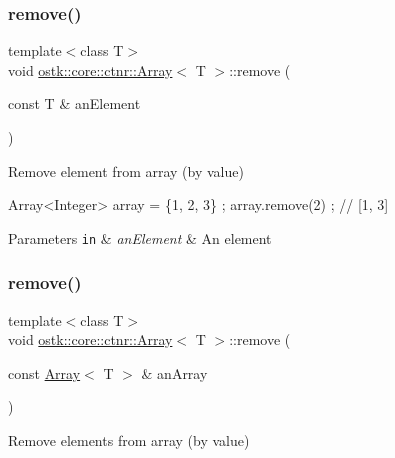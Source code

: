 \subsubsection{\texorpdfstring{remove()}{remove()}\hspace{0.1cm}{\footnotesize\ttfamily [1/2]}}
{\footnotesize\ttfamily template$<$class T$>$ \\
void \hyperlink{classostk_1_1core_1_1ctnr_1_1_array}{ostk\+::core\+::ctnr\+::\+Array}$<$ T $>$\+::remove (\begin{DoxyParamCaption}\item[{const T \&}]{an\+Element }\end{DoxyParamCaption})}



Remove element from array (by value) 


\begin{DoxyCode}
Array<Integer> array = \{1, 2, 3\} ;
array.remove(2) ; \textcolor{comment}{// [1, 3]}
\end{DoxyCode}



\begin{DoxyParams}[1]{Parameters}
\mbox{\tt in}  & {\em an\+Element} & An element \\
\hline
\end{DoxyParams}
\mbox{\label{classostk_1_1core_1_1ctnr_1_1_array_a9409ea2330b85382d25bc4df7c6b993f}} 
\subsubsection{\texorpdfstring{remove()}{remove()}\hspace{0.1cm}{\footnotesize\ttfamily [2/2]}}
{\footnotesize\ttfamily template$<$class T$>$ \\
void \hyperlink{classostk_1_1core_1_1ctnr_1_1_array}{ostk\+::core\+::ctnr\+::\+Array}$<$ T $>$\+::remove (\begin{DoxyParamCaption}\item[{const \hyperlink{classostk_1_1core_1_1ctnr_1_1_array}{Array}$<$ T $>$ \&}]{an\+Array }\end{DoxyParamCaption})}



Remove elements from array (by value) 



